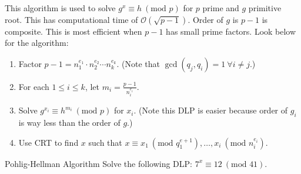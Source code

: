 This algorithm is used to solve \(g^x \equiv h \ (\text{mod } p)\) for \(p\) prime and \(g\) primitive root. This has computational time of \(\mathcal{O}(\sqrt{p-1})\). Order of \(g\) is \(p-1\) is composite. This is most efficient when \(p - 1\) has small prime factors. Look below for the algorithm:

\begin{enumerate}
    \item Factor \(p - 1 = n_1^{e_1} \cdot n_2^{e_2} \cdots n_k^{e_k}\). (Note that \(\gcd(q_j, q_i) = 1 \  \forall i \ne j\).)
    \item For each \(1 \leq i \leq k\), let \(m_i = \frac{p-1}{n_i^{e_i}}\).
    \item Solve \(g^{x_i} \equiv h^{m_i} \ (\text{mod } p)\) for \(x_i\). (Note this DLP is easier because order of \(g_i\) is way less than the order of \(g\).)
    \item Use CRT to find \(x\) such that \(x \equiv x_1 \ (\text{mod } q_1^{e+1}), \dots, x_i \ (\text{mod } n_i^{e_i})\).
\end{enumerate}

\begin{example}
    {Pohlig-Hellman Algorithm} Solve the following DLP: \(7^x \equiv 12 \ (\text{mod } 41)\).
\end{example}


